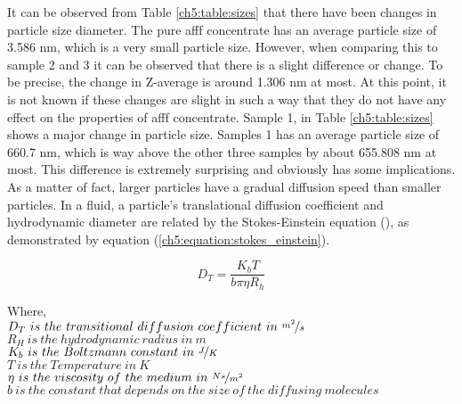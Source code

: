 It can be observed from Table \ref{ch5:table:sizes} that there have been changes in particle size diameter. The pure \acrshort{afff} concentrate has an average particle size of 3.586 nm, which is a very small particle size. However, when comparing this to sample 2 and 3 it can be observed that there is a slight difference or change. To be precise, the change in Z-average is around 1.306 nm at most. At this point, it is not known if these changes are slight in such a way that they do not have any effect on the properties of \acrshort{afff} concentrate. Sample 1, in Table \ref{ch5:table:sizes} shows a major change in particle size. Samples 1 has an average particle size of 660.7 nm, which is way above the other three samples by about 655.808 nm at most. This difference is extremely surprising and obviously has some implications. As a matter of fact, larger particles have a gradual diffusion speed than smaller particles. In a fluid, a particle's translational diffusion coefficient and hydrodynamic diameter are related by the Stokes-Einstein equation (\cite{lin1991handbook}), as demonstrated by equation (\ref{ch5:equation:stokes_einstein}).

\begin{equation}
    D_T=\frac{K_bT}{b\pi \eta R_h}
    \label{ch5:equation:stokes_einstein}
\end{equation}

\begin{doublespace}
Where, \\
$D_T\ is\ the\ transitional\ diffusion\ coefficient\ in\ \nicefrac{m^2}{s}$ \\
$R_H\ is\ the\ hydrodynamic\ radius\ in\ m$ \\
$K_b\ is\ the\ Boltzmann\ constant\ in\ \nicefrac{J}{K}$ \\
$T\ is\ the\ Temperature\ in\ K$ \\
$\eta\ is\ the\ viscosity\ of\ the\ medium\ in\ \nicefrac{Ns}{m^2}$ \\
$b\ is\ the\ constant\ that\ depends\ on\ the\ size\ of\ the\ diffusing\ molecules$ \\
\end{doublespace}

